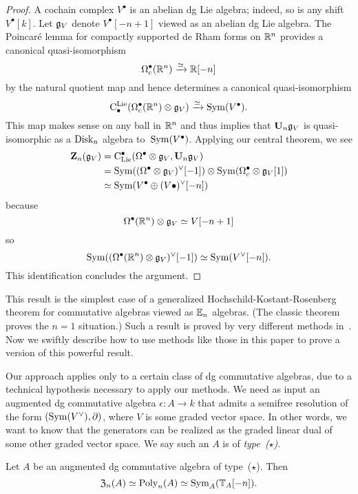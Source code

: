\documentclass[11pt]{amsart}
\numberwithin{equation}{section}
\begin{document}
\begin{proof}
A cochain complex $V^\bullet$ is an abelian dg Lie algebra;
indeed, so is any shift $V^\bullet[k]$. 
Let $\mathfrak g_V$ denote $V^\bullet[-n+1]$ viewed as an abelian dg Lie algebra.
The Poincar\'e lemma for compactly supported de Rham forms on $\mathbb R^n$ provides a canonical quasi-isomorphism
\[
\Omega^\bullet_c(\mathbb R^n) \xrightarrow{\simeq} \mathbb R[-n]
\]
by the natural quotient map and hence determines a canonical quasi-isomorphism
\[
{\rm C}^{\rm Lie}_\bullet(\Omega^\bullet_c(\mathbb R^n) \otimes \mathfrak g_V) \xrightarrow{\simeq} {\rm Sym}(V^\bullet).
\]
This map makes sense on any ball in $\mathbb R^n$ and thus implies that $\mathbf U_n \mathfrak g_V$ is quasi-isomorphic as a ${\rm Disk}_n$ algebra to~${\rm Sym}(V^\bullet)$.
Applying our central theorem, we see
\begin{align*}
\mathbf Z_n(\mathfrak g_V) &= {\rm C}_{\rm Lie}^\bullet(\Omega^\bullet \otimes \mathfrak g_V, \mathbf U_n \mathfrak g_V) \\
&= {\rm Sym}((\Omega^\bullet \otimes \mathfrak g_V)^\vee[-1]) \otimes {\rm Sym}(\Omega^\bullet_c \otimes \mathfrak g_V[1])\\
& \simeq {\rm Sym}(V^\bullet \oplus (V\bullet)^\vee[-n])
\end{align*}
because
\[
\Omega^\bullet (\mathbb R^n) \otimes \mathfrak g_V \simeq V[-n+1]
\]
so
\[
{\rm Sym}( (\Omega^\bullet(\mathbb R^n) \otimes \mathfrak g_V)^\vee[-1]) \simeq {\rm Sym}( V^\vee[-n]).
\]
This identification concludes the argument.
\end{proof}

This result is the simplest case of a generalized Hochschild-Kostant-Rosenberg theorem for commutative algebras viewed as $\mathbb E_n$ algebras.
(The classic theorem proves the $n=1$ situation.)
Such a result is proved by very different methods in~\cite{CalWil}.
Now we swiftly describe how to use methods like those in this paper to prove a version of this powerful result.

Our approach applies only to a certain class of dg commutative algebras,
due to a technical hypothesis necessary to apply our methods.
We need as input an augmented dg commutative algebra $\epsilon: A \to k$ that admits a semifree resolution of the form $({\rm Sym}(V^\vee), \partial)$, where $V$ is some graded vector space.
In other words, we want to know that the generators can be realized as the graded linear dual of some other graded vector space.
We say such an $A$ is of {\em type~($\star$)}.

\begin{prp}
Let $A$ be an augmented dg commutative algebra of type~($\star$).
Then 
\[
{\frak Z}_n(A) \simeq {\rm Poly}_n(A) \simeq {\rm Sym}_A(\mathbb T_A[-n]).
\]
\end{prp}
\end{document}

